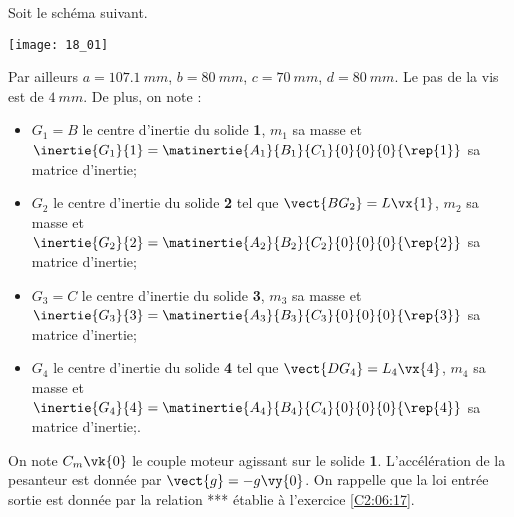 \normalfalse \difficilefalse \tdifficiletrue
\correctionfalse


\setcounter{question}{0}%
\ifcorrection
\else
{}
\fi

\ifprof
\else

Soit le schéma suivant. 
\begin{marginfigure}
\texttt{[image: 18\_01]}
\end{marginfigure}


Par ailleurs $a=\SI{107,1}{mm}$, $b=\SI{80}{mm}$, $c=\SI{70}{mm}$, $d=\SI{80}{mm}$. Le pas de la vis est de $\SI{4}{mm}$. De plus, on note :
\begin{itemize}
\item $G_1=B$ le centre d'inertie du solide \textbf{1}, $m_1$ sa masse et $\inertie{G_1}{1}=\matinertie{A_1}{B_1}{C_1}{0}{0}{0}{\rep{1}}$ sa matrice d'inertie;
\item $G_2$ le centre d'inertie du solide \textbf{2} tel que $\vect{BG_2}=L\vx{1}$, $m_2$ sa masse et $\inertie{G_2}{2}=\matinertie{A_2}{B_2}{C_2}{0}{0}{0}{\rep{2}}$ sa matrice d'inertie;
\item $G_3=C$ le centre d'inertie du solide \textbf{3}, $m_3$ sa masse et $\inertie{G_3}{3}=\matinertie{A_3}{B_3}{C_3}{0}{0}{0}{\rep{3}}$ sa matrice d'inertie;
\item $G_4$ le centre d'inertie du solide \textbf{4} tel que $\vect{DG_4}=L_4\vx{4}$, $m_4$ sa masse et $\inertie{G_4}{4}=\matinertie{A_4}{B_4}{C_4}{0}{0}{0}{\rep{4}}$ sa matrice d'inertie;.
\end{itemize}
On note $C_m\vk{0}$ le couple moteur agissant sur le solide \textbf{1}. L'accélération de la pesanteur est donnée par $\vect{g}=-g\vy{0}$.
On rappelle que la loi entrée sortie est donnée par la relation *** établie à l'exercice \ref{C2:06:17}.

\fi

\ifprof
\else
\fi

\ifprof
\else
\fi

\ifprof
\else
\fi

\ifprof
\else
\fi

\ifprof
\else
\fi

\ifprof
\else


\fi